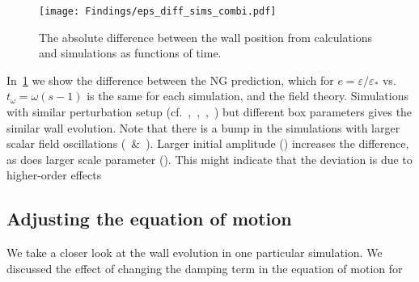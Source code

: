     \begin{figure}[h]
        \centering
        \texttt{[image: Findings/eps\_diff\_sims\_combi.pdf]}
        \caption{The absolute difference between the wall position from calculations and simulations as functions of time.}
        \label{fig:results:epsilon:eps_diff_sims_combi}
    \end{figure}
    In~\cref{fig:results:epsilon:eps_diff_sims_combi} we show the difference between the NG prediction, which for $e=\varepsilon/\varepsilon_\ast$ vs. $t_\omega=\omega (s-1)$ is the same for each simulation, and the field theory. Simulations with similar perturbation setup (cf.~,~,~,~) but different box parameters gives the similar wall evolution. Note that there is a bump in the simulations with larger scalar field oscillations (~\&~). %
    Larger initial amplitude () increases the difference, as does larger scale parameter (). %
    This might indicate that the deviation is due to higher-order effects 








    \subsection{Adjusting the equation of motion}
        We take a closer look at the wall evolution in one particular simulation. We discussed the effect of changing the damping term in the equation of motion for \blahblah


